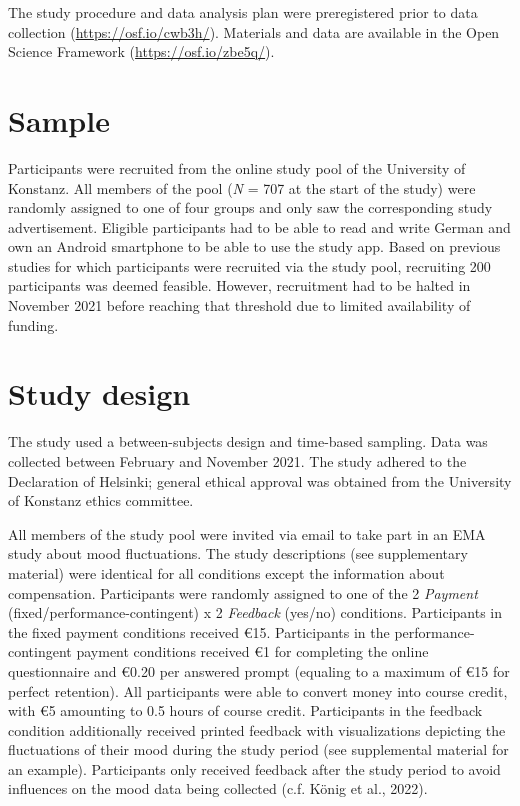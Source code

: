 \documentclass[authordate, empirical]{jote-new-article}
\begin{document}
	The study procedure and data analysis plan were preregistered prior to data collection (\href{https://osf.io/cwb3h/}{https://osf.io/cwb3h/}). Materials and data are available in the Open Science Framework (\href{https://osf.io/zbe5q/}{https://osf.io/zbe5q/}).



	\section{\textbf{Sample}}



	Participants were recruited from the online study pool of the University of Konstanz. All members of the pool (\emph{N} = 707 at the start of the study) were randomly assigned to one of four groups and only saw the corresponding study advertisement. Eligible participants had to be able to read and write German and own an Android smartphone to be able to use the study app. Based on previous studies for which participants were recruited via the study pool, recruiting 200 participants was deemed feasible. However, recruitment had to be halted in November 2021 before reaching that threshold due to limited availability of funding.



	\section{\textbf{Study design}}



	The study used a between-subjects design and time-based sampling. Data was collected between February and November 2021. The study adhered to the Declaration of Helsinki; general ethical approval was obtained from the University of Konstanz ethics committee.



	All members of the study pool were invited via email to take part in an EMA study about mood fluctuations. The study descriptions (see supplementary material) were identical for all conditions except the information about compensation. Participants were randomly assigned to one of the 2 \emph{Payment }(fixed/performance-contingent) x 2 \emph{Feedback }(yes/no) conditions. Participants in the fixed payment conditions received €15. Participants in the performance-contingent payment conditions received €1 for completing the online questionnaire and €0.20 per answered prompt (equaling to a maximum of €15 for perfect retention). All participants were able to convert money into course credit, with €5 amounting to 0.5 hours of course credit. Participants in the feedback condition additionally received printed feedback with visualizations depicting the fluctuations of their mood during the study period (see supplemental material for an example). Participants only received feedback after the study period to avoid influences on the mood data being collected (c.f. König et al., 2022).
\end{document}
